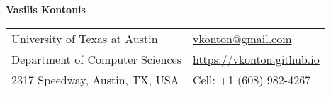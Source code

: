 \documentclass[letterpaper,11pt,oneside]{article}
\begin{document}

\noindent  \LARGE{\textbf{Vasilis Kontonis}}  \\
\vspace{-2ex}
\normalsize


\begin{center}
\begin{tabular}{l l}
 University of Texas at Austin& \hspace{1in} \href{mailto:vkonton@gmail.com}{vkonton@gmail.com} \\
 Department of Computer Sciences & \hspace{1in}  \href{https://vkonton.github.io}{https://vkonton.github.io}\\ 
 2317 Speedway, Austin, TX, USA & \hspace{1in} Cell: +1 (608) 982-4267 
\end{tabular}
\end{center}


\end{document}
